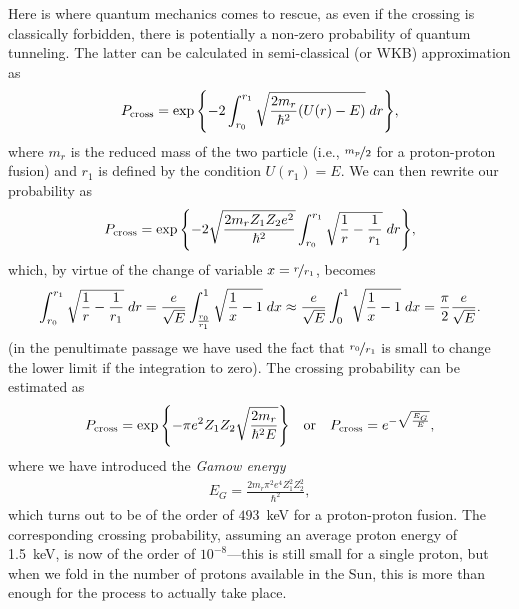 Here is where quantum mechanics comes to rescue, as even if the crossing is classically
forbidden, there is potentially a non-zero probability of quantum tunneling. The
latter can be calculated in semi-classical (or WKB) approximation as
\begin{align*}
  P_\text{cross} = \exp\qty{-2\int_{r_0}^{r_1} \sqrt{\frac{2m_r}{\hbar^2} (U(r) - E)} \ensuremath{\;d{r}}},
\end{align*}
where $m_r$ is the reduced mass of the two particle (i.e., $\nicefrac{m_p}{2}$ for
a proton-proton fusion) and $r_1$ is defined by the condition
$U(r_1) = E$. We can then rewrite our probability as
\begin{align*}
  P_\text{cross} = \exp\qty{-2 \sqrt{\frac{2m_r Z_1 Z_2 e^2}{\hbar^2}}
  \int_{r_0}^{r_1} \sqrt{\frac{1}{r} - \frac{1}{r_1}} \ensuremath{\;d{r}}},
\end{align*}
which, by virtue of the change of variable $x = \nicefrac{r}{r_1}$, becomes
\begin{align*}
  \int_{r_0}^{r_1} \sqrt{\frac{1}{r} - \frac{1}{r_1}} \;d{r} =
  \frac{e}{\sqrt{E}} \int_\frac{r_0}{r_1}^{1} \sqrt{\frac{1}{x} - 1} \;d{x}
  \approx \frac{e}{\sqrt{E}} \int_0^1 \sqrt{\frac{1}{x} - 1} \;d{x} =
  \frac{\pi}{2} \frac{e}{\sqrt{E}}.
\end{align*}
(in the penultimate passage we have used the fact that $\nicefrac{r_0}{r_1}$ is
small to change the lower limit if the integration to zero). The crossing probability
can be estimated as
\begin{align}
  P_\text{cross} = \exp\qty{-\pi e^2 Z_1 Z_2 \sqrt{\frac{2m_r}{\hbar^2 E}}}
  \quad\text{or}\quad
  P_\text{cross} = e^{-\sqrt{\frac{E_G}{E}}},
\end{align}
where we have introduced the \emph{Gamow energy}
\begin{align}
  E_G = \frac{2m_r \pi^2 e^4 Z_1^2 Z_2^2}{\hbar^2},
\end{align}
which turns out to be of the order of $493$~keV for a proton-proton fusion. The corresponding
crossing probability, assuming an average proton energy of 1.5~keV, is now of the
order of $10^{-8}$---this is still small for a single proton, but when we fold in
the number of protons available in the Sun, this is more than enough for the process
to actually take place.

